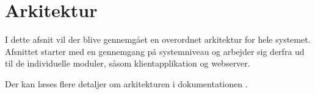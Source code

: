 \chapter{Arkitektur}
I dette afsnit vil der blive gennemgået en overordnet arkitektur for hele systemet. Afsnittet starter med en gennemgang på systemniveau og arbejder sig derfra ud til de individuelle moduler, såsom klientapplikation og webserver.

Der kan læses flere detaljer om arkitekturen i dokumentationen \cite{software-architecture}.
